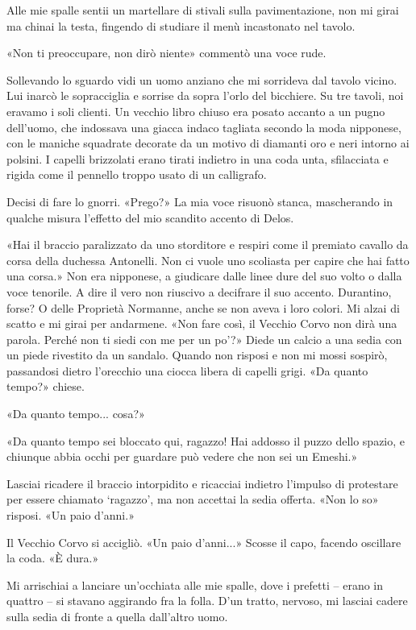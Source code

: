 Alle mie spalle sentii un martellare di stivali sulla pavimentazione,
non mi girai ma chinai la testa, fingendo di studiare il menù
incastonato nel tavolo.

«Non ti preoccupare, non dirò niente» commentò una voce rude.

Sollevando lo sguardo vidi un uomo anziano che mi sorrideva dal tavolo
vicino. Lui inarcò le sopracciglia e sorrise da sopra l'orlo del
bicchiere. Su tre tavoli, noi eravamo i soli clienti. Un vecchio libro
chiuso era posato accanto a un pugno dell'uomo, che indossava una giacca
indaco tagliata secondo la moda nipponese, con le maniche squadrate
decorate da un motivo di diamanti oro e neri intorno ai polsini. I
capelli brizzolati erano tirati indietro in una coda unta, sfilacciata e
rigida come il pennello troppo usato di un calligrafo.

Decisi di fare lo gnorri. «Prego?» La mia voce risuonò stanca,
mascherando in qualche misura l'effetto del mio scandito accento di
Delos.

«Hai il braccio paralizzato da uno storditore e respiri come il premiato
cavallo da corsa della duchessa Antonelli. Non ci vuole uno scoliasta
per capire che hai fatto una corsa.» Non era {nipponese}, a giudicare
dalle linee dure del suo volto o dalla voce tenorile. A dire il vero non
riuscivo a decifrare il suo accento. Durantino, forse? O delle Proprietà
Normanne, anche se non aveva i loro colori. Mi alzai di scatto e mi
girai per andarmene. «Non fare così, il Vecchio Corvo non dirà una
parola. Perché non ti siedi con me per un po'?» Diede un calcio a una
sedia con un piede rivestito da un sandalo. Quando non risposi e non mi
mossi sospirò, passandosi dietro l'orecchio una ciocca libera di capelli
grigi. «Da quanto tempo?» chiese.

«Da quanto tempo... cosa?»

«Da quanto tempo sei bloccato qui, ragazzo! Hai addosso il puzzo dello
spazio, e chiunque abbia occhi per guardare può vedere che non sei un
Emeshi.»

Lasciai ricadere il braccio intorpidito e ricacciai indietro l'impulso
di protestare per essere chiamato `ragazzo', ma non accettai la sedia
offerta. «Non lo so» risposi. «Un paio d'anni.»

Il Vecchio Corvo si accigliò. «Un paio d'anni...» Scosse il capo,
facendo oscillare la coda. «È dura.»

Mi arrischiai a lanciare un'occhiata alle mie spalle, dove i prefetti --
erano in quattro -- si stavano aggirando fra la folla. D'un tratto,
nervoso, mi lasciai cadere sulla sedia di fronte a quella dall'altro
uomo.

